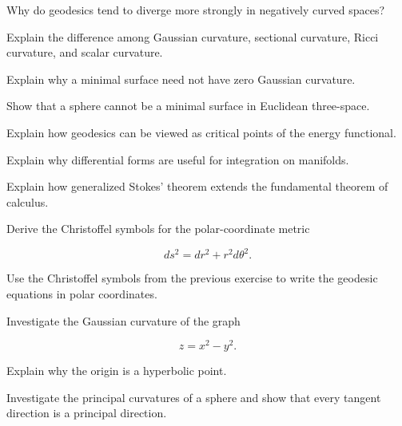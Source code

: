 \begin{exercise}[3]
Why do geodesics tend to diverge more strongly in negatively curved spaces?
\end{exercise}

\begin{exercise}[3]
Explain the difference among Gaussian curvature, sectional curvature, Ricci
curvature, and scalar curvature.
\end{exercise}

\begin{exercise}[3]
Explain why a minimal surface need not have zero Gaussian curvature.
\end{exercise}

\begin{exercise}[3]
Show that a sphere cannot be a minimal surface in Euclidean three-space.
\end{exercise}

\begin{exercise}[3]
Explain how geodesics can be viewed as critical points of the energy
functional.
\end{exercise}

\begin{exercise}[3]
Explain why differential forms are useful for integration on manifolds.
\end{exercise}

\begin{exercise}[3]
Explain how generalized Stokes' theorem extends the fundamental theorem of
calculus.
\end{exercise}

\begin{exercise}[4]
Derive the Christoffel symbols for the polar-coordinate metric

\[
ds^2=dr^2+r^2d\theta^2.
\]
\end{exercise}

\begin{exercise}[4]
Use the Christoffel symbols from the previous exercise to write the geodesic
equations in polar coordinates.
\end{exercise}

\begin{exercise}[4]
Investigate the Gaussian curvature of the graph

\[
z=x^2-y^2.
\]

Explain why the origin is a hyperbolic point.
\end{exercise}

\begin{exercise}[4]
Investigate the principal curvatures of a sphere and show that every tangent
direction is a principal direction.
\end{exercise}

